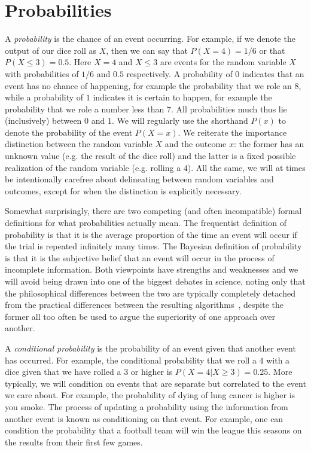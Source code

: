 \section{Probabilities}
\label{sec:prob:prob}

A \emph{probability} is
the chance of an event occurring.  For example, if we denote the output
of our dice roll as $X$, then we can say that $P(X=4) = 1/6$ or that $P(X\le3) = 0.5$.  Here
$X=4$ and $X\le3$ are events for the random variable $X$ with probabilities of $1/6$ and $0.5$
respectively.   A probability of $0$ indicates that an event has no chance of happening, 
for example the probability that we role an $8$, while
a probability of $1$ indicates it is certain to happen, for example the probability 
that we role a number less than $7$.  All probabilities much thus lie (inclusively) between $0$ and $1$.  
We will regularly use the shorthand $P(x)$ to denote the probability of the event $P(X=x)$.  
We reiterate the importance distinction between the random variable $X$ and the outcome $x$:
the former has an unknown value (e.g. the result of the dice roll) and the latter is
a fixed possible realization of the random variable (e.g. rolling a $4$).
All the same, we will at times be intentionally carefree about delineating between
random variables and outcomes, except for when the distinction is explicitly necessary.

Somewhat surprisingly, there are two competing (and often incompatible)
formal definitions for what probabilities actually mean.  The frequentist definition of
probability is that it is the average proportion of the time an event will occur if the trial is 
repeated infinitely many times.  The Bayesian definition of probability is that it is the subjective
belief that an event will occur in the process of incomplete information.  Both viewpoints have
strengths and weaknesses and we will avoid being drawn into one of the biggest debates in
science, noting only that the philosophical differences between the two are typically completely
detached from the practical differences between the resulting
algorithms~\citep{steinhardt2012beyond}, despite the former all too often be used to argue
the superiority of one approach over another.

A \emph{conditional probability} is the probability of an event given that another event has occurred.
For example, the conditional probability that we roll a $4$ with a dice given that we have rolled a $3$ or
higher is $P(X=4 | X\ge3) = 0.25$.  More typically, we will condition on events that are separate but
correlated to the event we care about.  For example, the probability of dying of lung cancer is higher
is you smoke.  The process of updating a probability using the information from another event is
known as conditioning on that event.  For example, one can condition the probability that a football team
will win the league this seasons on the results from their first few games.  

